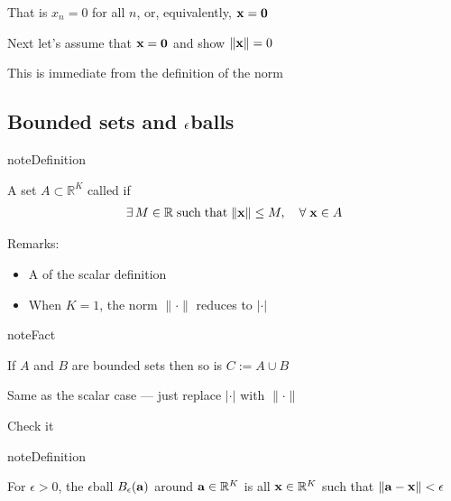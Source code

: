\documentclass[letterpaper,10pt,english]{jupyterBook}
\begin{document}
\sphinxAtStartPar
That is \(x_n = 0\) for all \(n\), or, equivalently, \({\bf x} = {\bf 0}\)

\sphinxAtStartPar
Next let’s assume that \({\bf x} = {\bf 0}\) and show \(\| {\bf x} \| = 0\)

\sphinxAtStartPar
This is immediate from the definition of the norm


\subsection{Bounded sets and \protect\(\epsilon\protect\)\sphinxhyphen{}balls}
\label{\detokenize{04.basic_analysis:bounded-sets-and-epsilon-balls}}
\begin{sphinxadmonition}{note}{Definition}

\sphinxAtStartPar
A set \(A \subset \mathbb{R}^K\) called  if
\begin{equation*}
\begin{split}
\exists \, M \in \mathbb{R} 
\; \mathrm{such\;that} \;
\|{\bf x}\| \leq M, \quad \forall \; {\bf x} \in A
\end{split}
\end{equation*}\end{sphinxadmonition}

\sphinxAtStartPar
Remarks:
\begin{itemize}
\item {} 
\sphinxAtStartPar
A  of the scalar definition

\item {} 
\sphinxAtStartPar
When \(K=1\), the norm \(\| \cdot \|\) reduces to \(|\cdot|\)

\end{itemize}

\begin{sphinxadmonition}{note}{Fact}

\sphinxAtStartPar
If \(A\) and \(B\) are bounded sets then so is \(C := A \cup B\)
\end{sphinxadmonition}

\sphinxAtStartPar
{}  Same as the scalar case — just replace \(|\cdot|\) with \(\| \cdot \|\)

\sphinxAtStartPar
{} Check it

\begin{sphinxadmonition}{note}{Definition}

\sphinxAtStartPar
For \(\epsilon > 0\), the \(\epsilon\)\sphinxhyphen{}ball \(B_{\epsilon}({\bf a})\) around
\({\bf a} \in \mathbb{R}^K\) is all \({\bf x} \in \mathbb{R}^K\) such that \(\|{\bf a} - {\bf x}\|
< \epsilon\)
\end{sphinxadmonition}
\end{document}
